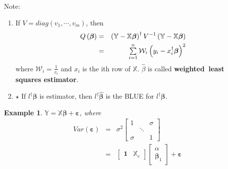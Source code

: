 \documentclass{article}
\newtheorem{example}[theorem]{Example}
\begin{document}
\bigskip

Note:

\begin{enumerate}
\item If $V=diag\left( v_{1},\cdots ,v_{m}\right) $, then%
\begin{eqnarray*}
Q\left( \boldsymbol{\beta }\right) &=&\left( \mathbb{Y-X}\boldsymbol{\beta }%
\right) ^{\dagger }V^{-1}\left( \mathbb{Y-X}\boldsymbol{\beta }\right) \\
&=&\tsum\limits_{i=1}^{n}\mathcal{W}_{i}\left( y_{i}-x_{i}^{\dagger }%
\boldsymbol{\beta }\right) ^{2}
\end{eqnarray*}%
where $\mathcal{W}_{i}=\frac{1}{v_{i}}$ and $x_{i}$ is the ith row of $%
\mathbb{X}$. $\hat{\beta}$ is called \textbf{weighted\ least squares
estimator}.

\item $\star $ If $l^{\dagger }\boldsymbol{\beta }$ is estimator, then $%
l^{\dagger }\boldsymbol{\hat{\beta}}$ is the BLUE for $l^{\dagger }%
\boldsymbol{\beta }$.\newline
\newline
\end{enumerate}

\begin{example}
$\mathbb{Y}=\mathbb{X}\boldsymbol{\beta }+\boldsymbol{\varepsilon }$, where%
\begin{eqnarray*}
Var\left( \boldsymbol{\varepsilon }\right) &=&\sigma ^{2}\left[ 
\begin{array}{ccc}
1 &  & \sigma \\ 
& \ddots &  \\ 
\sigma &  & 1%
\end{array}%
\right] \\
&=&\left[ 
\begin{array}{cc}
\boldsymbol{1} & \mathbb{X}_{c}%
\end{array}%
\right] \left[ 
\begin{array}{c}
\alpha \\ 
\boldsymbol{\beta }_{1}%
\end{array}%
\right] +\boldsymbol{\varepsilon }
\end{eqnarray*}%
\newline
\end{example}
\end{document}
